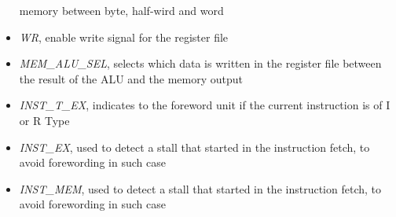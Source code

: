 \begin{itemize}
	      memory between byte, half-wird and word
	\item \textit{WR}, enable write signal for the register file
	\item \textit{MEM\_ALU\_SEL}, selects which data is written in the register
	      file between the result of the ALU and the memory output 
	\item \textit{INST\_T\_EX}, indicates to the foreword unit if the current 
	      instruction is of I or R Type
	\item \textit{INST\_EX}, used to detect a stall that started in the
	      instruction fetch, to avoid forewording in such case 
	\item \textit{INST\_MEM}, used to detect a stall that started in the
		  instruction fetch, to avoid forewording in such
		  case 								
\end{itemize}





